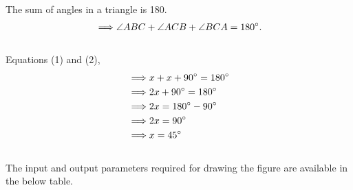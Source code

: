 \documentclass[journal,12pt,twocolumn]{IEEEtran}
\begin{document}
\begin{flushleft}
	  The sum of angles in a triangle is 180{\degree}.\\
	  
	  \begin{align}{\implies} \angle{ABC}+\angle{ACB}+\angle{BCA}=180{\degree}.\end{align}\\
	  Equations (1) and (2),\\
	  \begin{align}
	  &{\implies}x+x+90{\degree}=180{\degree}\\
	  &{\implies}2x+90{\degree}=180{\degree}\\
	  &{\implies}2x=180{\degree}-90{\degree}\\
	  &{\implies}2x=90{\degree}\\
	  &{\implies}x=45{\degree}\end{align}\\
	  
	    The input and output parameters required for drawing the figure are available in the below table.\\
	  

\end{flushleft}
\end{document}
